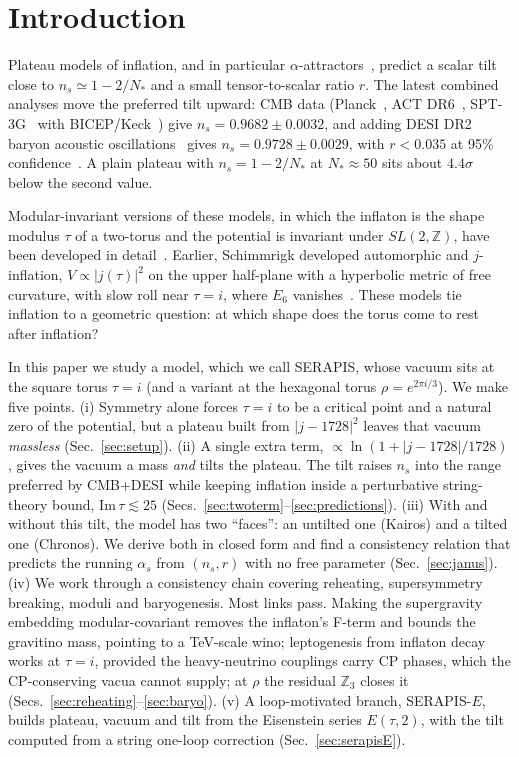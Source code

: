 \documentclass[aps,prd,twocolumn,superscriptaddress,nofootinbib,floatfix]{revtex4-2}
\begin{document}
\section{Introduction}
Plateau models of inflation, and in particular $\alpha$-attractors~\cite{arXiv_1306_5220}, predict a scalar tilt close to $n_s \simeq 1-2/N_*$ and a small tensor-to-scalar ratio $r$. The latest combined analyses move the preferred tilt upward: CMB data (Planck~\cite{Planck2018X}, ACT DR6~\cite{arXiv_2503_14452}, SPT-3G~\cite{arXiv_2506_20707} with BICEP/Keck~\cite{arXiv_2110_00483}) give $n_s = 0.9682 \pm 0.0032$, and adding DESI DR2 baryon acoustic oscillations~\cite{arXiv_2503_14738} gives $n_s = 0.9728 \pm 0.0029$, with $r < 0.035$ at 95\% confidence~\cite{arXiv_2512_10613}. A plain plateau with $n_s=1-2/N_*$ at $N_* \approx 50$ sits about $4.4\sigma$ below the second value.

Modular-invariant versions of these models, in which the inflaton is the shape modulus $\tau$ of a two-torus and the potential is invariant under $SL(2,\mathbb{Z})$, have been developed in detail~\cite{arXiv_2408_05203,arXiv_2412_19324,arXiv_2405_06497,arXiv_2407_12081,arXiv_2411_18603}. Earlier, Schimmrigk developed automorphic and $j$-inflation, $V\propto|j(\tau)|^2$ on the upper half-plane with a hyperbolic metric of free curvature, with slow roll near $\tau=i$, where $E_6$ vanishes~\cite{arXiv_1512_09082,arXiv_1612_09559}. These models tie inflation to a geometric question: at which shape does the torus come to rest after inflation?

In this paper we study a model, which we call SERAPIS, whose vacuum sits at the square torus $\tau = i$ (and a variant at the hexagonal torus $\rho = e^{2\pi i/3}$). We make five points.
(i) Symmetry alone forces $\tau = i$ to be a critical point and a natural zero of the potential, but a plateau built from $|j-1728|^2$ leaves that vacuum \emph{massless} (Sec.~\ref{sec:setup}).
(ii) A single extra term, $\propto \ln(1+|j-1728|/1728)$, gives the vacuum a mass \emph{and} tilts the plateau. The tilt raises $n_s$ into the range preferred by CMB+DESI while keeping inflation inside a perturbative string-theory bound, $\mathrm{Im}\,\tau \lesssim 25$ (Secs.~\ref{sec:twoterm}--\ref{sec:predictions}).
(iii) With and without this tilt, the model has two ``faces'': an untilted one (Kairos) and a tilted one (Chronos). We derive both in closed form and find a consistency relation that predicts the running $\alpha_s$ from $(n_s, r)$ with no free parameter (Sec.~\ref{sec:janus}).
(iv) We work through a consistency chain covering reheating, supersymmetry breaking, moduli and baryogenesis. Most links pass. Making the supergravity embedding modular-covariant removes the inflaton's F-term and bounds the gravitino mass, pointing to a TeV-scale wino; leptogenesis from inflaton decay works at $\tau=i$, provided the heavy-neutrino couplings carry CP phases, which the CP-conserving vacua cannot supply; at $\rho$ the residual $\mathbb{Z}_3$ closes it (Secs.~\ref{sec:reheating}--\ref{sec:baryo}).
(v) A loop-motivated branch, SERAPIS-$E$, builds plateau, vacuum and tilt from the Eisenstein series $E(\tau,2)$, with the tilt computed from a string one-loop correction (Sec.~\ref{sec:serapisE}).
\end{document}
